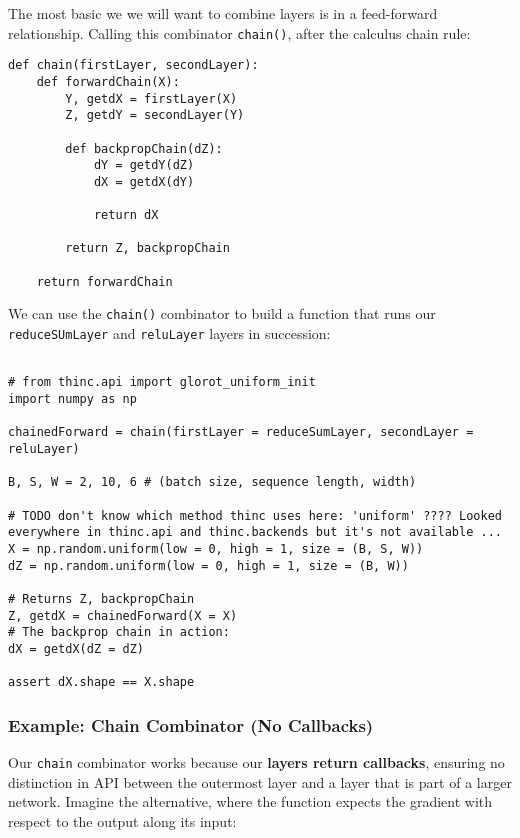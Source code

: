\documentclass[
]{article}
\begin{document}
The most basic we we will want to combine layers is in a feed-forward
relationship. Calling this combinator \texttt{chain()},
after the calculus chain rule:

\begin{verbatim}
def chain(firstLayer, secondLayer):
    def forwardChain(X):
        Y, getdX = firstLayer(X)
        Z, getdY = secondLayer(Y)

        def backpropChain(dZ):
            dY = getdY(dZ)
            dX = getdX(dY)

            return dX

        return Z, backpropChain

    return forwardChain
\end{verbatim}

We can use the \texttt{chain()} combinator to build a
function that runs our \texttt{reduceSUmLayer} and
\texttt{reluLayer} layers in succession:

\begin{verbatim}

# from thinc.api import glorot_uniform_init
import numpy as np

chainedForward = chain(firstLayer = reduceSumLayer, secondLayer = reluLayer)

B, S, W = 2, 10, 6 # (batch size, sequence length, width)

# TODO don't know which method thinc uses here: 'uniform' ???? Looked everywhere in thinc.api and thinc.backends but it's not available ...
X = np.random.uniform(low = 0, high = 1, size = (B, S, W))
dZ = np.random.uniform(low = 0, high = 1, size = (B, W))

# Returns Z, backpropChain
Z, getdX = chainedForward(X = X)
# The backprop chain in action:
dX = getdX(dZ = dZ)

assert dX.shape == X.shape
\end{verbatim}

\hypertarget{example-chain-combinator-no-callbacks}{%
\subsubsection{Example: Chain Combinator (No
Callbacks)}\label{example-chain-combinator-no-callbacks}}

Our \texttt{chain} combinator works because our
\textbf{layers return callbacks}, ensuring no distinction in API between
the outermost layer and a layer that is part of a larger network.
Imagine the alternative, where the function expects the gradient with
respect to the output along its input:
\end{document}
